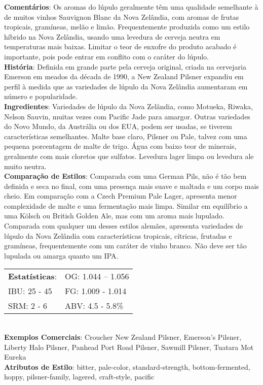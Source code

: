 \textbf{Comentários}: Os aromas do lúpulo geralmente têm uma qualidade semelhante à de muitos vinhos Sauvignon Blanc da Nova Zelândia, com aromas de frutas tropicais, gramíneas, melão e limão. Frequentemente produzida como um estilo híbrido na Nova Zelândia, usando uma levedura de cerveja neutra em temperaturas mais baixas. Limitar o teor de enxofre do produto acabado é importante, pois pode entrar em conflito com o caráter do lúpulo. \\
\textbf{História}: Definida em grande parte pela cerveja original, criada na cervejaria Emerson em meados da década de 1990, a New Zealand Pilsner expandiu em perfil à medida que as variedades de lúpulo da Nova Zelândia aumentaram em número e popularidade. \\
\textbf{Ingredientes}: Variedades de lúpulo da Nova Zelândia, como Motueka, Riwaka, Nelson Sauvin, muitas vezes com Pacific Jade para amargor. Outras variedades do Novo Mundo, da Austrália ou dos EUA, podem ser usadas, se tiverem características semelhantes. Malte base claro, Pilsner ou Pale, talvez com uma pequena porcentagem de malte de trigo. Água com baixo teor de minerais, geralmente com mais cloretos que sulfatos. Levedura lager limpa ou levedura ale muito neutra. \\
\textbf{Comparação de Estilos}: Comparada com uma German Pils, não é tão bem definida e seca no final, com uma presença mais suave e maltada e um corpo mais cheio. Em comparação com a Czech Premium Pale Lager, apresenta menor complexidade de malte e uma fermentação mais limpa. Similar em equilíbrio a uma Kölsch ou British Golden Ale, mas com um aroma mais lupulado. Comparada com qualquer um desses estilos alemães, apresenta variedades de lúpulo da Nova Zelândia com características tropicais, cítricas, frutadas e gramíneas, frequentemente com um caráter de vinho branco. Não deve ser tão lupulada ou amarga quanto um IPA. \\
\begin{tabular}{@{}p{35mm}p{35mm}@{}}
  \textbf{Estatísticas}: & OG: 1.044 – 1.056\\
  IBU: 25 - 45 & FG: 1.009 - 1.014 \\
  SRM: 2 - 6  & ABV: 4.5 - 5.8\%
\end{tabular}\\
\textbf{Exemplos Comerciais}: Croucher New Zealand Pilsner, Emerson’s Pilsner, Liberty Halo Pilsner, Panhead Port Road Pilsner, Sawmill Pilsner, Tuatara Mot Eureka \\
\textbf{Atributos de Estilo}: bitter, pale-color, standard-strength, bottom-fermented, hoppy, pilsner-family, lagered, craft-style, pacific